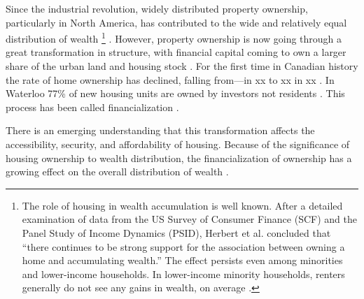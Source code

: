 Since the industrial revolution, widely distributed property ownership, particularly in North America, has contributed to the wide and relatively equal distribution of {wealth} \footnote{The role of housing in wealth accumulation is well known. After a detailed  examination of data from the US  Survey of Consumer Finance (SCF) and the Panel Study of Income Dynamics (PSID), Herbert et al. concluded that ``there continues to be strong support for the association between owning a home and accumulating wealth.'' The effect persists even among minorities and lower-income households. In lower-income minority households, renters generally do not see any gains in wealth, on average \cite{herbertHomeownershipStillEffective2013}.} \cite{pikettyCapitalTwentyfirstCentury2014, harrisGrowthHomeOwnership1977, chevanGrowthHomeOwnership1989, andrewsEvolutionHomeownershipRates2011}. 
However, property ownership is now going through a great transformation in structure, with financial capital coming to own a larger share of the urban land and housing stock \cite{farhaReportFinancializationHousing2017, palleyFinancializationWhatIt2007}. For the first time in Canadian history the rate of home ownership has declined, falling from---in xx to xx in xx \cite{GET_homeownership_rates}. %
In Waterloo 77\% of new housing units are owned by investors not residents \cite{GET77percent}. %
This process has been called financialization \cite{farhaReportFinancializationHousing2017, hansenFinanceCapitalismFinancialization2014}. 

There is an emerging understanding that this transformation affects the accessibility, security, and affordability of housing. 
Because of the significance of housing ownership to wealth distribution, the  financialization of ownership %
has a growing effect on the overall distribution of wealth
\cite{tomaskovic-deveyFinancializationCausesInequality2013, palleyFinancializationWhatIt2007, seccarecciaUnderstandingFinancializationHistory2013, nemtinFinancializationHousingSocial2021}. %

